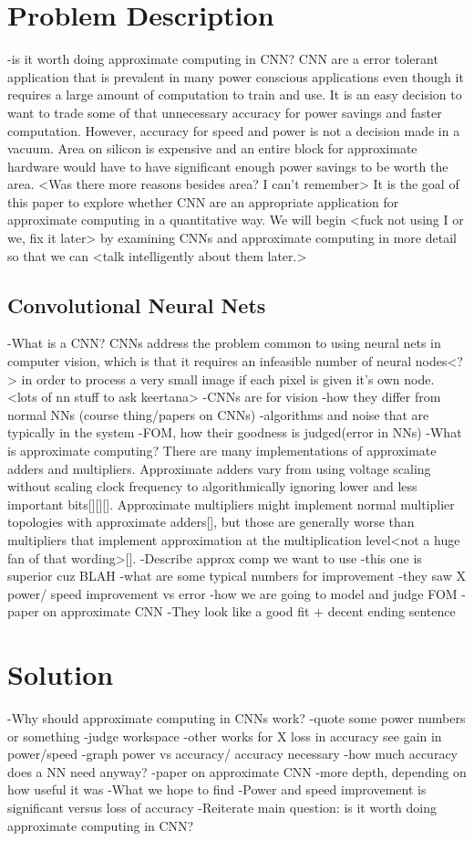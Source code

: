 \documentclass[conference]{IEEEtran}
\begin{document}
\section{Problem Description}
-is it worth doing approximate computing in CNN?
CNN are a error tolerant application that is prevalent in many power conscious applications even though it requires a large amount of computation to train and use. It is an easy decision to want to trade some of that unnecessary accuracy for power savings and faster computation. However, accuracy for speed and power is not a decision made in a vacuum. Area on silicon is expensive and an entire block for approximate hardware would have to have significant enough power savings to be worth the area. <Was there more reasons besides area? I can't remember> It is the goal of this paper to explore whether CNN are an appropriate application for approximate computing in a quantitative way. We will begin <fuck not using I or we, fix it later> by examining CNNs and approximate computing in more detail so that we can <talk intelligently about them later.>
\subsection{Convolutional Neural Nets}
-What is a CNN? 
CNNs address the problem common to using neural nets in computer vision, which is that it requires an infeasible number of neural nodes<?> in order to process a very small image if each pixel is given it's own node. <lots of nn stuff to ask keertana>
	-CNNs are for vision
	-how they differ from normal NNs (course thing/papers on CNNs)
-algorithms and noise that are typically in the system
-FOM, how their goodness is judged(error in NNs)
-What is approximate computing?
There are many implementations of approximate adders and multipliers. Approximate adders vary from using voltage scaling without scaling clock frequency to algorithmically ignoring lower and less important bits[][][]. Approximate multipliers might implement normal multiplier topologies with approximate adders[], but those are generally worse than multipliers that implement approximation at the multiplication level<not a huge fan of that wording>[].
	-Describe approx comp we want to use
		-this one is superior cuz BLAH
	-what are some typical numbers for improvement
		-they saw X power/ speed improvement vs error
	-how we are going to model and judge FOM
-paper on approximate CNN
-They look like a good fit + decent ending sentence

\section{Solution}
-Why should approximate computing in CNNs work?
	-quote some power numbers or something
-judge workspace
		-other works for X loss in accuracy see gain in power/speed
		-graph power vs accuracy/ accuracy necessary
			-how much accuracy does a NN need anyway?
-paper on approximate CNN
	-more depth, depending on how useful it was
-What we hope to find
	-Power and speed improvement is significant versus loss of accuracy
	-Reiterate main question: is it worth doing approximate computing in CNN?
\end{document}
